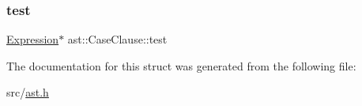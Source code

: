 \subsubsection{\texorpdfstring{test}{test}}
{\footnotesize\ttfamily \hyperlink{structast_1_1_expression}{Expression}$\ast$ ast\+::\+Case\+Clause\+::test}



The documentation for this struct was generated from the following file\+:\begin{DoxyCompactItemize}
\item 
src/\hyperlink{ast_8h}{ast.\+h}\end{DoxyCompactItemize}
